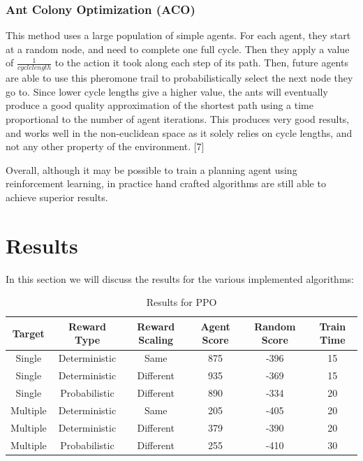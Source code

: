 \documentclass{article}
\begin{document}
	\subsubsection{Ant Colony Optimization (ACO)}
	\label{aco}
	This method uses a large population of simple agents. For each agent, they start at a random node, and need to complete one full cycle. Then they apply a value of $\frac{1}{cycle length}$ to the action it took along each step of its path. Then, future agents are able to use this pheromone trail to probabilistically select the next node they go to. Since lower cycle lengths give a higher value, the ants will eventually produce a good quality approximation of the shortest path using a time proportional to the number of agent iterations. This produces very good results, and works well in the non-euclidean space as it solely relies on cycle lengths, and not any other property of the environment. [7]
	
	Overall, although it may be possible to train a planning agent using reinforcement learning, in practice hand crafted algorithms are still able to achieve superior results.
	
	\section{Results}
	\label{results}
	In this section we will discuss the results for the various implemented algorithms:
	
	\begin{table}[h]
		\centering
		\caption[]{Results for PPO}\label{Results for PPO}%
		\begin{tabular}{cccccc}
			\toprule
			Target & Reward Type & Reward Scaling\footnotemark[1] & Agent Score\footnotemark[2] & Random Score\footnotemark[2] & Train Time\footnotemark[3]\\
			\midrule
			Single &  Deterministic & Same & 875 & -396 & 15\\
			Single & Deterministic & Different\footnotemark[4] & 935 & -369 & 15\\
			Single & Probabilistic & Different & 890 & -334 & 20\\
			\midrule
			Multiple & Deterministic & Same & 205 & -405 & 20\\
			Multiple & Deterministic & Different & 379 & -390 & 20\\
			Multiple & Probabilistic & Different & 255 & -410 & 30\\
			\bottomrule
		\end{tabular}
	\end{table}
	
\end{document}
